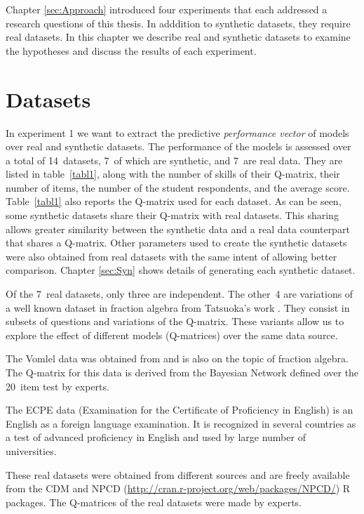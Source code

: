 \label{sec:SIGNATURE}

Chapter \ref{sec:Approach} introduced four experiments that each addressed a research questions of this thesis. In adddition to synthetic datasets, they require real datasets. In this chapter we describe real and synthetic datasets to examine the hypotheses and discuss the results of each experiment.

\section{Datasets}

In experiment 1 we want to extract the predictive \textit{performance vector} of models over real and synthetic datasets. The performance of the models is assessed over a total of 14~datasets, 7~of which are synthetic, and 7~are real data. They are listed in table~\ref{tabl1}, along with the number of skills of their Q-matrix, their number of items, the number of the student respondents, and the average score. Table~\ref{tabl1} also reports the Q-matrix used for each dataset. As can be seen, some synthetic datasets share their Q-matrix with real datasets. This sharing allows greater similarity between the synthetic data and a real data counterpart that shares a Q-matrix. Other parameters used to create the synthetic datasets were also obtained from real datasets with the same intent of allowing better comparison. Chapter \ref{sec:Syn} shows details of generating each synthetic dataset.

Of the 7~real datasets, only three are independent. The other~4 are variations of a well known dataset in fraction algebra from Tatsuoka's work \citep{tatsuoka1984analysis}. They consist in subsets of questions and variations of the Q-matrix. These variants allow us to explore the effect of different models (Q-matrices) over the same data source.

The Vomlel data was obtained from \citep{vomlel:2004} and is also on the topic of fraction algebra. The Q-matrix for this data is derived from the Bayesian Network defined over the 20~item test by experts.

The ECPE data (Examination for the Certificate of Proficiency in English) is an English as a foreign language examination. It is recognized in several countries as a test of advanced proficiency in English and used by large number of universities.

These real datasets were obtained from different sources and are freely available from the CDM \citep{Robitzsch2012} and NPCD ({\url{http://cran.r-project.org/web/packages/NPCD/}}) R packages. The Q-matrices of the real datasets were made by experts.

